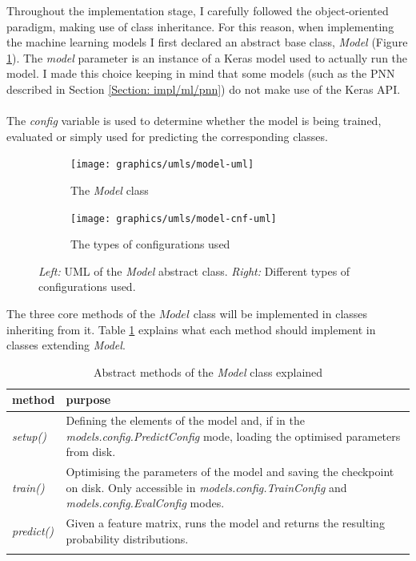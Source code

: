 	Throughout the implementation stage, I carefully followed the object-oriented paradigm, making use of class inheritance. For this reason, when implementing the machine learning models I first declared an abstract base class, \textit{Model} (Figure \ref{Fig: impl/ml/model/uml/model}). The \textit{model} parameter is an instance of a Keras model used to actually run the model. I made this choice keeping in mind that some models (such as the PNN described in Section \ref{Section: impl/ml/pnn}) do not make use of the Keras API. 
	\\ \\
	The \textit{config} variable is used to determine whether the model is being trained, evaluated or simply used for predicting the corresponding classes.
	\begin{figure}[H]
		\centering
		\begin{subfigure}[b]{.3\textwidth}
			\texttt{[image: graphics/umls/model-uml]}
			\caption{The \textit{Model} class}
			\label{Fig: impl/ml/model/uml/model}
			\hspace{1pt}
		\end{subfigure}\hfill
		\begin{subfigure}[b]{.55\textwidth}
			\texttt{[image: graphics/umls/model-cnf-uml]}
			\caption{The types of configurations used}
			\label{Fig: impl/ml/model/uml/configs}
		\end{subfigure}
		\caption{\textit{Left:} UML of the \textit{Model} abstract class. \textit{Right:} Different types of configurations used.}
		\label{Fig: impl/ml/model/uml}
	\end{figure}
	The three core methods of the $Model$ class will be implemented in classes inheriting from it. Table \ref{Table: impl/ml/model/purpose} explains what each method should implement in classes extending \textit{Model}.
	\begin{longtable}{p{}p{}}
		\textbf{method} & \textbf{purpose} \\
		\hline
		\textit{setup()} & Defining the elements of the model and, if in the \textit{models.config.PredictConfig} mode, loading the optimised parameters from disk. \\
		\hline
		\textit{train()} & Optimising the parameters of the model and saving the checkpoint on disk. Only accessible in \textit{models.config.TrainConfig} and \textit{models.config.EvalConfig} modes. \\
		\hline
		\textit{predict()} & Given a feature matrix, runs the model and returns the resulting probability distributions. \\
		\hline
		\caption{Abstract methods of the \textit{Model} class explained}
		\label{Table: impl/ml/model/purpose}
	\end{longtable}

